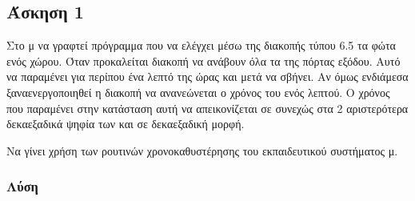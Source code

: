 \newpage\subsection*{Άσκηση 1}

Στο μ να γραφτεί πρόγραμμα  που να ελέγχει μέσω της διακοπής τύπου  6.5 τα φώτα ενός χώρου.
Όταν προκαλείται διακοπή  να ανάβουν όλα τα  της πόρτας εξόδου. Αυτό να παραμένει για περίπου ένα λεπτό 
της ώρας και μετά να σβήνει. Αν όμως ενδιάμεσα ξαναενεργοποιηθεί η διακοπή να ανανεώνεται ο χρόνος του ενός λεπτού. Ο χρόνος που
παραμένει στην κατάσταση αυτή να απεικονίζεται σε  συνεχώς στα 2 αριστερότερα δεκαεξαδικά ψηφία των  και
σε δεκαεξαδική μορφή.

Να γίνει χρήση των ρουτινών χρονοκαθυστέρησης του εκπαιδευτικού συστήματος μ.

\subsubsection*{Λύση}

\inputminted{text}{./exercise1/exercise.8085}

